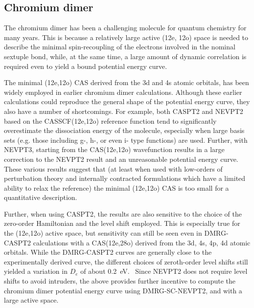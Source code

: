 \subsection{Chromium dimer}

The chromium dimer has been a challenging molecule for quantum chemistry for many years. This
is because a relatively large active (12e, 12o) space  is needed to 
describe the minimal spin-recoupling
of the electrons involved in the nominal sextuple bond, while, at the same time, a large amount of dynamic correlation is  required 
even to yield a bound potential energy curve. \cite{andersson_cr2_1994,roos_multiconfigurational_1995,roos_multiconfigurational_1996,roos_ground_2003,angeli_third-order_2006,muller_large-scale_2009,kurashige_second-order_2011,sharma_multireference_2015}

The minimal (12e,12o) CAS derived from the 3d and 4s atomic orbitals, has been  widely employed in earlier chromium dimer calculations.\cite{andersson_cr2_1994,roos_multiconfigurational_1995,roos_multiconfigurational_1996,angeli_third-order_2006,muller_large-scale_2009,sharma_multireference_2015} Although these earlier calculations
could reproduce the general shape of the potential energy curve, they
also have a number of shortcomings.
For example,  both CASPT2\cite{andersson_cr2_1994,roos_multiconfigurational_1995,roos_multiconfigurational_1996} and NEVPT2\cite{angeli_n-electron_2001} based on the CASSCF(12e,12o) reference function tend to significantly overestimate the 
dissociation energy of the molecule, especially when large basis sets (e.g. those including g-, h-, or even i- type functions) are used.\cite{celani_cipt2_2004,angeli_third-order_2006} Further, with NEVPT3, \cite{angeli_third-order_2006} starting
from the CAS(12e,12o) wavefunction  results in a large correction to the NEVPT2 result 
and an unreasonable potential energy curve. These various results suggest 
that (at least when used with low-orders of perturbation
theory and internally contracted formulations which have a limited ability to relax the reference) the minimal (12e,12o) CAS is too small for a quantitative description.

Further, when using CASPT2, the results are also  sensitive to the choice of the zero-order Hamiltonian and
the level shift employed.\cite{celani_cipt2_2004,ruiperez_complete_2011} This is 
especially true for the (12e,12o) active space,
but sensitivity can still be seen even in  DMRG-CASPT2 calculations with a CAS(12e,28o) derived from the 3d, 4s, 4p, 4d atomic orbitals. While
the DMRG-CASPT2 curves are generally close to the experimentally derived
 curve, the different choices of zeroth-order level shifts 
still yielded a variation in $D_e$ 
of about 0.2~eV.~\cite{kurashige_second-order_2011} Since NEVPT2 does not require level shifts to avoid intruders, the above provides further incentive
to compute the chromium dimer potential energy curve using DMRG-SC-NEVPT2,
and with a large active space.

